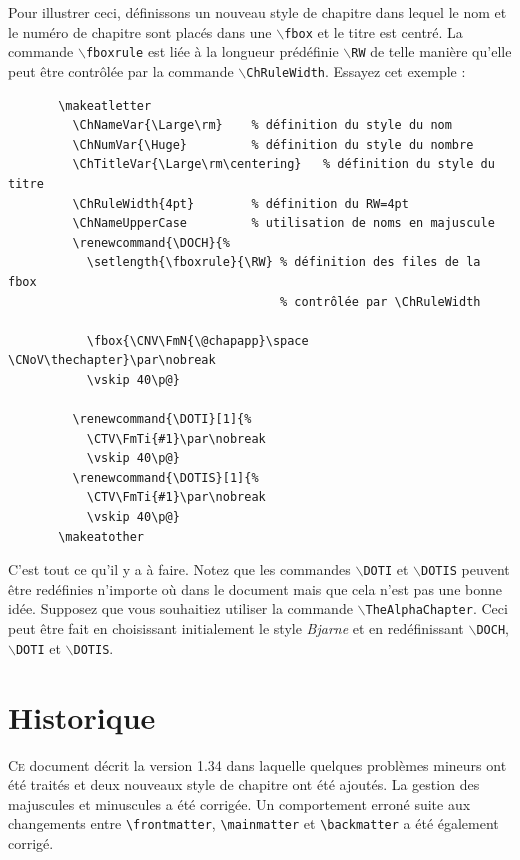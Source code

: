 \documentclass{report}
\newcommand{\A}[1]{{$\backslash${\tt #1}}}
\begin{document}
    Pour illustrer ceci, définissons un nouveau style de chapitre dans lequel
    le nom et le numéro de chapitre sont placés dans une \A{fbox} et le titre
    est centré.
    La commande \A{fboxrule} est liée à la longueur prédéfinie \A{RW} de telle
    manière qu'elle peut être contrôlée par la commande \A{ChRuleWidth}. 
    Essayez cet exemple :
    \begin{verbatim}
       \makeatletter
         \ChNameVar{\Large\rm}    % définition du style du nom
         \ChNumVar{\Huge}         % définition du style du nombre
         \ChTitleVar{\Large\rm\centering}   % définition du style du titre
         \ChRuleWidth{4pt}        % définition du RW=4pt
         \ChNameUpperCase         % utilisation de noms en majuscule
         \renewcommand{\DOCH}{%
           \setlength{\fboxrule}{\RW} % définition des files de la fbox 
                                      % contrôlée par \ChRuleWidth

           \fbox{\CNV\FmN{\@chapapp}\space \CNoV\thechapter}\par\nobreak
           \vskip 40\p@}

         \renewcommand{\DOTI}[1]{%
           \CTV\FmTi{#1}\par\nobreak
           \vskip 40\p@}
         \renewcommand{\DOTIS}[1]{%
           \CTV\FmTi{#1}\par\nobreak
           \vskip 40\p@}
       \makeatother
    \end{verbatim}

    C'est tout ce qu'il y a à faire. Notez que les commandes \A{DOTI} et
    \A{DOTIS} peuvent être redéfinies n'importe où dans le document mais que 
    cela n'est pas une bonne idée. Supposez que vous souhaitiez utiliser la
    commande \A{TheAlphaChapter}. Ceci peut être fait en choisissant 
    initialement le style \emph{Bjarne} et en redéfinissant \A{DOCH}, \A{DOTI}
    et \A{DOTIS}.


  \chapter{Historique}
    \lettrine[findent=0.2em,nindent=0em,realheight=true]{C}{e} 
    document décrit la version 1.34 dans laquelle quelques problèmes mineurs
    ont été traités et deux nouveaux style de chapitre ont été ajoutés. La
    gestion des majuscules et minuscules a été corrigée. Un comportement 
    erroné suite aux changements entre \verb+\frontmatter+,
     \verb+\mainmatter+ et \verb+\backmatter+ a été également corrigé.   
\end{document}
